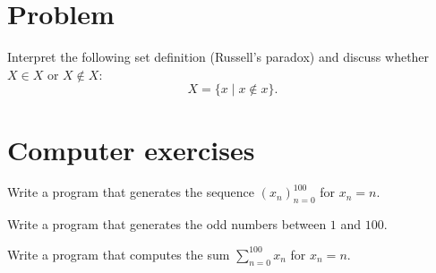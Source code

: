 \section*{Problem}

\begin{problem}
  Interpret the following set definition (Russell's paradox) and discuss
  whether $X \in X$ or $X \notin X$:
  \begin{equation}
    X = \{x \mid x \notin x\}.
  \end{equation}
\end{problem}

\section*{Computer exercises}

\begin{programming}
  Write a program that generates the sequence $(x_n)_{n=0}^{100}$
  for $x_n = n$.
\end{programming}

\begin{programming}
  Write a program that generates the odd numbers between $1$ and $100$.
\end{programming}

\begin{programming}
  Write a program that computes the sum $\sum_{n=0}^{100} x_n$
  for $x_n = n$.
\end{programming}



